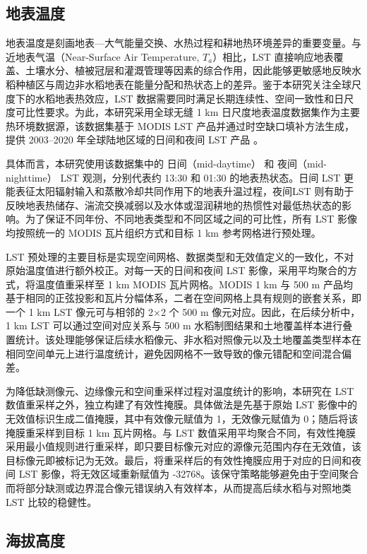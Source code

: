 \subsection{地表温度}
\label{sec:lst_data}

地表温度是刻画地表—大气能量交换、水热过程和耕地热环境差异的重要变量。与近地表气温（Near-Surface Air Temperature, $T_a$）相比，LST 直接响应地表覆盖、土壤水分、植被冠层和灌溉管理等因素的综合作用，因此能够更敏感地反映水稻种植区与周边非水稻地表在能量分配和热状态上的差异。鉴于本研究关注全球尺度下的水稻地表热效应，LST 数据需要同时满足长期连续性、空间一致性和日尺度可比性要求。为此，本研究采用全球无缝 1 km 日尺度地表温度数据集作为主要热环境数据源，该数据集基于 MODIS LST 产品并通过时空缺口填补方法生成，提供 2003--2020 年全球陆地区域的日间和夜间 LST 产品 \citep{Li2013RSELST,Zhang2022ESSDLST}。

具体而言，本研究使用该数据集中的 日间（mid-daytime） 和 夜间（mid-nighttime） LST 观测，分别代表约 13:30 和 01:30 的地表热状态。日间 LST 更能表征太阳辐射输入和蒸散冷却共同作用下的地表升温过程，夜间LST 则有助于反映地表热储存、湍流交换减弱以及水体或湿润耕地的热惯性对最低热状态的影响。为了保证不同年份、不同地表类型和不同区域之间的可比性，所有 LST 影像均按照统一的 MODIS 瓦片组织方式和目标 1 km 参考网格进行预处理。

LST 预处理的主要目标是实现空间网格、数据类型和无效值定义的一致化，不对原始温度值进行额外校正。对每一天的日间和夜间 LST 影像，采用平均聚合的方式，将温度值重采样至 1 km MODIS 瓦片网格。MODIS 1 km 与 500 m 产品均基于相同的正弦投影和瓦片分幅体系，二者在空间网格上具有规则的嵌套关系，即一个 1 km LST 像元可与相邻的 2×2 个 500 m 像元对应。因此，在后续分析中，1 km LST 可以通过空间对应关系与 500 m 水稻制图结果和土地覆盖样本进行叠置统计。该处理能够保证后续水稻像元、非水稻对照像元以及土地覆盖类型样本在相同空间单元上进行温度统计，避免因网格不一致导致的像元错配和空间混合偏差。

为降低缺测像元、边缘像元和空间重采样过程对温度统计的影响，本研究在 LST 数值重采样之外，独立构建了有效性掩膜。具体做法是先基于原始 LST 影像中的无效值标识生成二值掩膜，其中有效像元赋值为 1，无效像元赋值为 0；随后将该掩膜重采样到目标 1 km 瓦片网格。与 LST 数值采用平均聚合不同，有效性掩膜采用最小值规则进行重采样，即只要目标像元对应的源像元范围内存在无效值，该目标像元即被标记为无效。最后，将重采样后的有效性掩膜应用于对应的日间和夜间 LST 影像，将无效区域重新赋值为 -32768。该保守策略能够避免由于空间聚合而将部分缺测或边界混合像元错误纳入有效样本，从而提高后续水稻与对照地类 LST 比较的稳健性。
\clearpage

\subsection{海拔高度}

